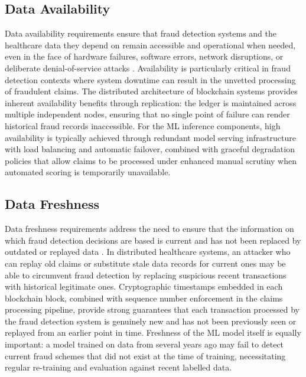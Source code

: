 \subsection{Data Availability}

Data availability requirements ensure that fraud detection systems and the healthcare data they depend on remain accessible and operational when needed, even in the face of hardware failures, software errors, network disruptions, or deliberate denial-of-service attacks \cite{zeadally2020}. Availability is particularly critical in fraud detection contexts where system downtime can result in the unvetted processing of fraudulent claims. The distributed architecture of blockchain systems provides inherent availability benefits through replication: the ledger is maintained across multiple independent nodes, ensuring that no single point of failure can render historical fraud records inaccessible. For the ML inference components, high availability is typically achieved through redundant model serving infrastructure with load balancing and automatic failover, combined with graceful degradation policies that allow claims to be processed under enhanced manual scrutiny when automated scoring is temporarily unavailable.

\subsection{Data Freshness}

Data freshness requirements address the need to ensure that the information on which fraud detection decisions are based is current and has not been replaced by outdated or replayed data \cite{tian2019}. In distributed healthcare systems, an attacker who can replay old claims or substitute stale data records for current ones may be able to circumvent fraud detection by replacing suspicious recent transactions with historical legitimate ones. Cryptographic timestamps embedded in each blockchain block, combined with sequence number enforcement in the claims processing pipeline, provide strong guarantees that each transaction processed by the fraud detection system is genuinely new and has not been previously seen or replayed from an earlier point in time. Freshness of the ML model itself is equally important: a model trained on data from several years ago may fail to detect current fraud schemes that did not exist at the time of training, necessitating regular re-training and evaluation against recent labelled data.


